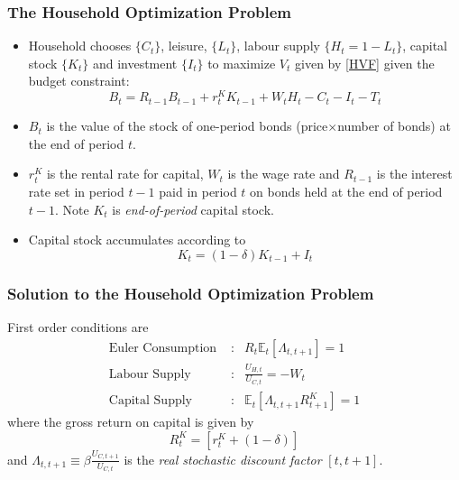 \documentclass[xcolor=dvipsnames,handout,aspectratio=169]{beamer}
\begin{document}
 \begin{frame}
 \frametitle{\textbf{The Household Optimization Problem}}
  \begin{itemize}
\item Household chooses
$\{C_t\}$, leisure, $\{L_t\}$, labour supply $\{H_t=1-L_t \}$, capital stock $\{K_t\}$ and investment  $\{I_t\}$ to maximize $V_t$ given by \eqref{HVF} given the
budget constraint:
\begin{equation}\label{HBC1}
  B_{t}= R_{t-1} B_{t-1}+r_{t}^K K_{t-1}+W_{t} H_t-C_t-I_t-T_t
\end{equation}
\item $B_t$ is the value of the stock of one-period bonds (price$\times$number of bonds) at the end of period $t$.
\item $r_{t}^K$ is the rental rate for capital, $W_t$ is the wage rate and $R_{t-1}$ is the interest rate set in period $t-1$ paid in period $t$ on bonds held at the end of period $t-1$.
Note $K_t$ is \emph{end-of-period} capital stock.
\item Capital stock accumulates according to
\begin{equation}\nonumber
K_{t}=(1-\delta) K_{t-1}+I_t
\end{equation}
\end{itemize}
\end{frame}

 \begin{frame}
 \frametitle{\textbf{Solution to the Household Optimization Problem}}
  First order conditions are
\begin{eqnarray*}
\mbox{Euler Consumption }&:&  R_{t}\mathbb{E}_t\left[ \Lambda_{t,t+1}\right]= 1  \label{RBCEuler}\\
\label{RBCMRS1}
\mbox{Labour Supply}&:&  \frac{U_{H,t}}{U_{C,t}}=-W_t\\
\mbox{Capital Supply}&:& \mathbb{E}_t\left[ \Lambda_{t,t+1} R_{t+1}^K\right]= 1  \label{RBCFOCK1A}
 \end{eqnarray*}
 where the gross return on capital is given by
\begin{equation*}
 R_{t}^K= \left[r_{t}^K +(1-\delta)\right]\label{RK}
\end{equation*}
 and $\Lambda_{t,t+1} \equiv \beta \frac{ U_{C,t+1}}{ U_{C,t}}$ is the \emph{real stochastic discount factor} $[t, t+1]$.
 \end{frame}
\end{document}
